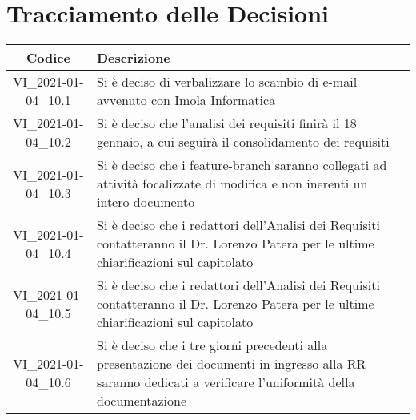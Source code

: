 \section*{Tracciamento delle Decisioni}

\begin{center}
	\begin{longtable}{|c|p{13cm}|}
	\hline
	\rowcolor{lighter-grayer}
	\textbf{Codice} & \textbf{Descrizione} \\
	\hline
	\endfirsthead

	\hline
	VI\_2021-01-04\_10.1 & Si è deciso di verbalizzare lo scambio di e-mail avvenuto con Imola Informatica\\
	\hline
	VI\_2021-01-04\_10.2 & Si è deciso che l'analisi dei requisiti finirà il 18 gennaio, a cui seguirà il consolidamento dei requisiti\\
	\hline
	VI\_2021-01-04\_10.3 & Si è deciso che i feature-branch saranno collegati ad attività focalizzate di modifica e non
inerenti un intero documento \\
	\hline
	VI\_2021-01-04\_10.4 & Si è deciso che i redattori dell’Analisi dei Requisiti contatteranno il Dr. Lorenzo Patera per le ultime
	chiarificazioni sul capitolato\\
	\hline
	VI\_2021-01-04\_10.5 & Si è deciso che i redattori dell’Analisi dei Requisiti contatteranno il Dr. Lorenzo Patera per le ultime
	chiarificazioni sul capitolato\\
	\hline
	VI\_2021-01-04\_10.6 & Si è deciso che i tre giorni precedenti alla presentazione dei documenti in ingresso alla RR saranno dedicati a verificare l'uniformità della documentazione\\
	\hline
	

	\end{longtable}
\end{center}